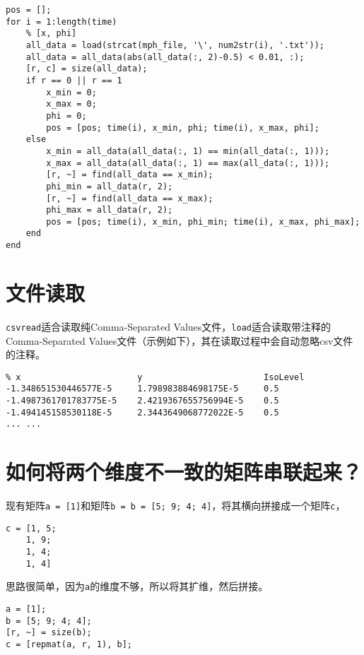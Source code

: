 \begin{verbatim}
pos = [];
for i = 1:length(time)
    % [x, phi]
    all_data = load(strcat(mph_file, '\', num2str(i), '.txt'));
    all_data = all_data(abs(all_data(:, 2)-0.5) < 0.01, :);
    [r, c] = size(all_data);
    if r == 0 || r == 1
        x_min = 0;
        x_max = 0;
        phi = 0;
        pos = [pos; time(i), x_min, phi; time(i), x_max, phi];
    else
        x_min = all_data(all_data(:, 1) == min(all_data(:, 1)));
        x_max = all_data(all_data(:, 1) == max(all_data(:, 1)));
        [r, ~] = find(all_data == x_min);
        phi_min = all_data(r, 2);
        [r, ~] = find(all_data == x_max);
        phi_max = all_data(r, 2);
        pos = [pos; time(i), x_min, phi_min; time(i), x_max, phi_max];
    end
end
\end{verbatim}

\section{文件读取}

\texttt{csvread}适合读取纯Comma-Separated Values文件，\texttt{load}适合读取带注释的Comma-Separated Values文件（示例如下），其在读取过程中会自动忽略csv文件的注释。

\begin{verbatim}
% x                       y                        IsoLevel
-1.348651530446577E-5     1.798983884698175E-5     0.5
-1.4987361701783775E-5    2.4219367655756994E-5    0.5
-1.494145158530118E-5     2.3443649068772022E-5    0.5
... ...
\end{verbatim}

\section{如何将两个维度不一致的矩阵串联起来？}

现有矩阵\texttt{a = [1]}和矩阵\texttt{b = b = [5; 9; 4; 4]}，将其横向拼接成一个矩阵\texttt{c}，

\begin{verbatim}
c = [1, 5;
    1, 9;
    1, 4;
    1, 4]
\end{verbatim}

思路很简单，因为\texttt{a}的维度不够，所以将其扩维，然后拼接。

\begin{verbatim}
a = [1];
b = [5; 9; 4; 4];
[r, ~] = size(b);
c = [repmat(a, r, 1), b];
\end{verbatim}

